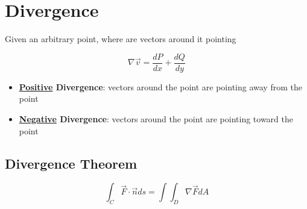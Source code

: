 \section{Divergence}

  Given an arbitrary point, where are vectors around it pointing

  \begin{equation}
    \nabla \vec{v} = \frac{dP}{dx} + \frac{dQ}{dy}
  \end{equation}

  \begin{itemize}
    \item \textbf{\ul{Positive} Divergence}: vectors around the point are
    pointing away from the point
    \item \textbf{\ul{Negative} Divergence}: vectors around the point are
    pointing toward the point
  \end{itemize}

  \subsection{Divergence Theorem}

    \begin{equation}
      \int_{C} \vec{F} \cdot \vec{n} ds = \int \int_{D} \nabla \vec{F} dA
    \end{equation}